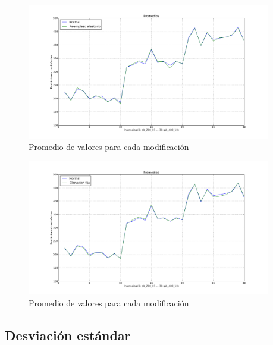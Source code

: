 \begin{figure}[H]
\begin{center}
\includegraphics[width=0.95\textwidth]{img/prom-3.pdf}
\end{center}
\caption{Promedio de valores para cada modificación}
\label{fig:prom-3}
\end{figure}


\begin{figure}[H]
\begin{center}
\includegraphics[width=0.95\textwidth]{img/prom-4.pdf}
\end{center}
\caption{Promedio de valores para cada modificación}
\label{fig:prom-4}
\end{figure}

\newpage

\subsection{Desviación estándar}

